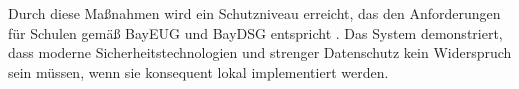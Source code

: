 Durch diese Maßnahmen wird ein Schutzniveau erreicht, das den Anforderungen für Schulen gemäß BayEUG und BayDSG entspricht \autocite{bayeug, baydsg}. Das System demonstriert, dass moderne Sicherheitstechnologien und strenger Datenschutz kein Widerspruch sein müssen, wenn sie konsequent lokal implementiert werden.



